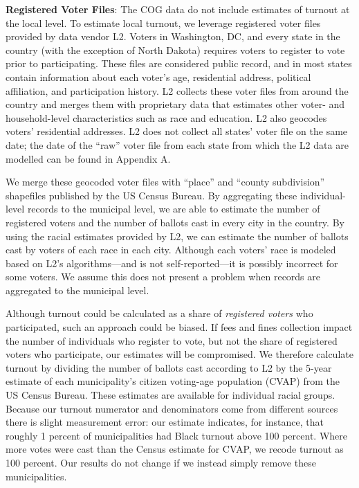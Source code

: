 \documentclass[
  12pt,
]{article}
\begin{document}
\textbf{Registered Voter Files}: The COG data do not include estimates of turnout at the local level. To estimate local turnout, we leverage registered voter files provided by data vendor L2. Voters in Washington, DC, and every state in the country (with the exception of North Dakota) requires voters to register to vote prior to participating. These files are considered public record, and in most states contain information about each voter's age, residential address, political affiliation, and participation history. L2 collects these voter files from around the country and merges them with proprietary data that estimates other voter- and household-level characteristics such as race and education. L2 also geocodes voters' residential addresses. L2 does not collect all states' voter file on the same date; the date of the ``raw'' voter file from each state from which the L2 data are modelled can be found in Appendix A.

We merge these geocoded voter files with ``place'' and ``county subdivision'' shapefiles published by the US Census Bureau. By aggregating these individual-level records to the municipal level, we are able to estimate the number of registered voters and the number of ballots cast in every city in the country. By using the racial estimates provided by L2, we can estimate the number of ballots cast by voters of each race in each city. Although each voters' race is modeled based on L2's algorithms---and is not self-reported---it is possibly incorrect for some voters. We assume this does not present a problem when records are aggregated to the municipal level.

Although turnout could be calculated as a share of \emph{registered voters} who participated, such an approach could be biased. If fees and fines collection impact the number of individuals who register to vote, but not the share of registered voters who participate, our estimates will be compromised. We therefore calculate turnout by dividing the number of ballots cast according to L2 by the 5-year estimate of each municipality's citizen voting-age population (CVAP) from the US Census Bureau. These estimates are available for individual racial groups. Because our turnout numerator and denominators come from different sources there is slight measurement error: our estimate indicates, for instance, that roughly 1 percent of municipalities had Black turnout above 100 percent. Where more votes were cast than the Census estimate for CVAP, we recode turnout as 100 percent. Our results do not change if we instead simply remove these municipalities.
\end{document}
